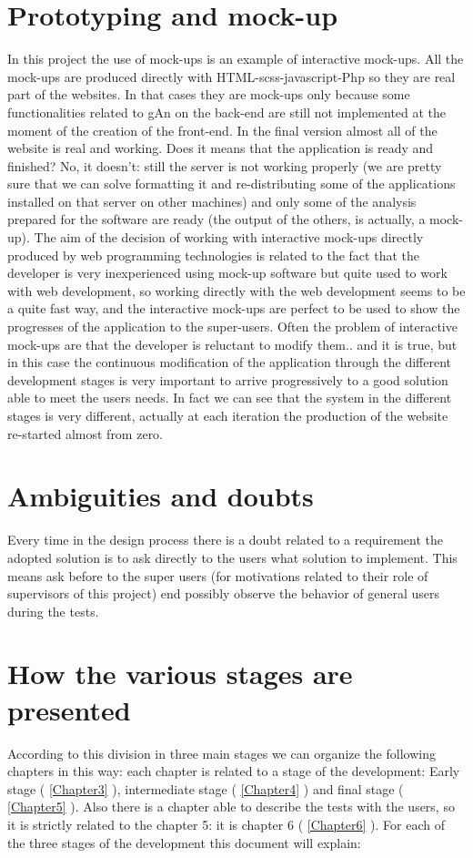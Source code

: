 \section{Prototyping and mock-up}
In this project the use of mock-ups is an example of interactive mock-ups. All the mock-ups are produced directly with HTML-scss-javascript-Php so they are real part of the websites. In that cases they are mock-ups only because some functionalities related to gAn on the back-end are still not implemented at the moment of the creation of the front-end. In the final version almost all of the website is real and working. Does it means that the application is ready and finished? No, it doesn't: still the server is not working properly (we are pretty sure that we can solve formatting it and re-distributing some of the applications installed on that server on other machines) and only some of the analysis prepared for the software are ready (the output of the others, is actually, a mock-up). The aim of the decision of working with interactive mock-ups directly produced by web programming technologies is related to the fact that the developer is very inexperienced using mock-up software but quite used to work with web development, so working directly with the web development seems to be a quite fast way, and the interactive mock-ups are perfect to be used to show the progresses of the application to the super-users.
Often the problem of interactive mock-ups are that the developer is reluctant to modify them.. and it is true, but in this case the continuous modification of the application through the different development stages is very important to arrive progressively to a good solution able to meet the users needs. In fact we can see that the system in the different stages is very different, actually at each iteration the production of the website re-started almost from zero. 

\section{Ambiguities and doubts}
Every time in the design process there is a doubt related to a requirement the adopted solution is to ask directly to the users what solution to implement. This means ask before to the super users (for motivations related to their role of supervisors of this project) end possibly observe the behavior of general 
users during the tests.

\section{How the various stages are presented}
According to this division in three main stages we can organize the following chapters in this way:
each chapter is related to a stage of the development: Early stage (  \ref{Chapter3} ), intermediate stage ( \ref{Chapter4} ) and final stage ( \ref{Chapter5} ). Also there is a chapter able to describe the tests with the users, so it is strictly related to the chapter 5: it is chapter 6 ( \ref{Chapter6} ).
For each of the three stages of the development this document will explain:

